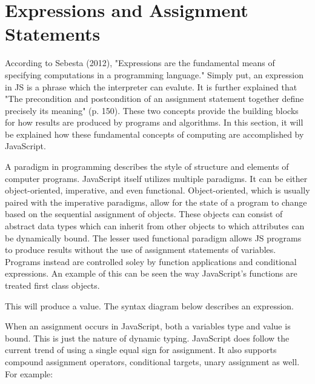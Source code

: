 \documentclass[man]{apa}
\begin{document}
\section{Expressions and Assignment Statements}

According to Sebesta (2012), "Expressions are the fundamental means of specifying computations in a programming language." Simply put, an expression in JS is a phrase which the interpreter can evalute. It is further explained that "The precondition and postcondition of an assignment statement together define precisely its meaning" (p. 150). These two concepts provide the building blocks for how results are produced by programs and algorithms. In this section, it will be explained how these fundamental concepts of computing are accomplished by JavaScript.

A paradigm in programming describes the style of structure and elements of computer programs. JavaScript itself utilizes multiple paradigms. It can be either object-oriented, imperative, and even functional. Object-oriented, which is usually paired with the imperative paradigms, allow for the state of a program to change based on the sequential assignment of objects. These objects can consist of abstract data types which can inherit from other objects to which attributes can be dynamically bound. The lesser used functional paradigm allows JS programs to produce results without the use of assignment statements of variables. Programs instead are controlled soley by function applications and conditional expressions. An example of this can be seen the way JavaScript's functions are treated first class objects.



 This will produce a value. The syntax diagram below describes an expression.


When an assignment occurs in JavaScript, both a variables type and value is bound. This is just the nature of dynamic typing. JavaScript does follow the current trend of using a single equal sign for assignment. It also supports compound assignment operators, conditional targets, unary assignment as well. For example:
\end{document}
